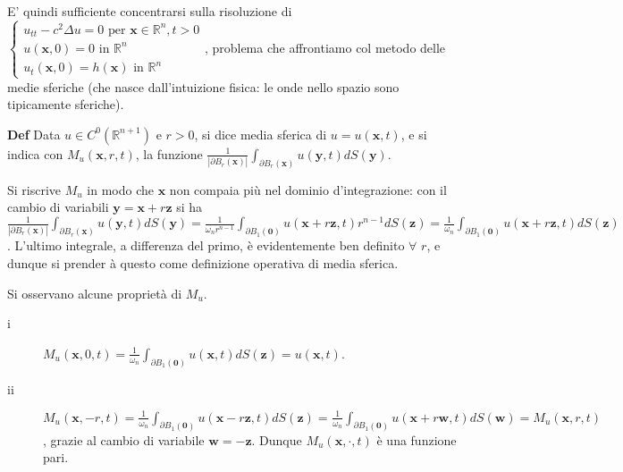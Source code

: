 \documentclass{article}
\begin{document}
E' quindi sufficiente concentrarsi sulla risoluzione di $\left\{ 
\begin{array}{c}
u_{tt}-c^{2}\Delta u=0\text{ per }\mathbf{x}\in 
\mathbb{R}
^{n},t>0 \\ 
u\left( \mathbf{x},0\right) =0\text{ in }%
\mathbb{R}
^{n} \\ 
u_{t}\left( \mathbf{x},0\right) =h\left( \mathbf{x}\right) \text{ in }%
\mathbb{R}
^{n}%
\end{array}%
\right. $, problema che affrontiamo col metodo delle medie sferiche (che
nasce dall'intuizione fisica: le onde nello spazio sono tipicamente
sferiche).

\textbf{Def} Data $u\in C^{0}\left( 
\mathbb{R}
^{n+1}\right) $ e $r>0$, si dice media sferica di $u=u\left( \mathbf{x}%
,t\right) $, e si indica con $M_{u}\left( \mathbf{x},r,t\right) $, la
funzione $\frac{1}{\left\vert \partial B_{r}\left( \mathbf{x}\right)
\right\vert }\int_{\partial B_{r}\left( \mathbf{x}\right) }u\left( \mathbf{y}%
,t\right) dS\left( \mathbf{y}\right) $.

Si riscrive $M_{u}$ in modo che $\mathbf{x}$ non compaia pi\`{u} nel dominio
d'integrazione: con il cambio di variabili $\mathbf{y}=\mathbf{x}+r\mathbf{z}
$ si ha $\frac{1}{\left\vert \partial B_{r}\left( \mathbf{x}\right)
\right\vert }\int_{\partial B_{r}\left( \mathbf{x}\right) }u\left( \mathbf{y}%
,t\right) dS\left( \mathbf{y}\right) =\frac{1}{\omega _{n}r^{n-1}}%
\int_{\partial B_{1}\left( \mathbf{0}\right) }u\left( \mathbf{x}+r\mathbf{z}%
,t\right) r^{n-1}dS\left( \mathbf{z}\right) =\frac{1}{\omega _{n}}%
\int_{\partial B_{1}\left( \mathbf{0}\right) }u\left( \mathbf{x}+r\mathbf{z}%
,t\right) dS\left( \mathbf{z}\right) $. L'ultimo integrale, a differenza del
primo, \`{e} evidentemente ben definito $\forall $ $r$, e dunque si prender%
\`{a} questo come definizione operativa di media sferica.

Si osservano alcune propriet\`{a} di $M_{u}$.

\begin{description}
\item[i] $M_{u}\left( \mathbf{x},0,t\right) =\frac{1}{\omega _{n}}%
\int_{\partial B_{1}\left( \mathbf{0}\right) }u\left( \mathbf{x},t\right)
dS\left( \mathbf{z}\right) =u\left( \mathbf{x},t\right) $.

\item[ii] $M_{u}\left( \mathbf{x},-r,t\right) =\frac{1}{\omega _{n}}%
\int_{\partial B_{1}\left( \mathbf{0}\right) }u\left( \mathbf{x}-r\mathbf{z}%
,t\right) dS\left( \mathbf{z}\right) =^{}\frac{1}{\omega _{n}}%
\int_{\partial B_{1}\left( \mathbf{0}\right) }u\left( \mathbf{x}+r\mathbf{w}%
,t\right) dS\left( \mathbf{w}\right) =M_{u}\left( \mathbf{x},r,t\right) $,
grazie al cambio di variabile $\mathbf{w=-z}$. Dunque $M_{u}\left( \mathbf{x}%
,\cdot ,t\right) $ \`{e} una funzione pari.
\end{description}
\end{document}
